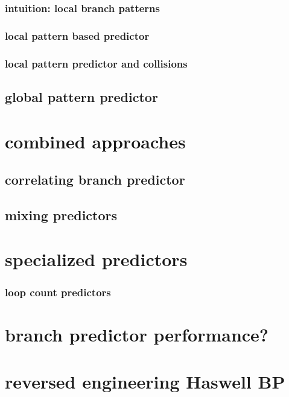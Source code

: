 \subsubsection{intuition: local branch patterns}

\subsubsection{local pattern based predictor}


\subsubsection{local pattern predictor and collisions}


\subsection{global pattern predictor}
 

\section{combined approaches}

\subsection{correlating branch predictor}

\subsection{mixing predictors}


\section{specialized predictors}
\subsubsection{loop count predictors}


\section{branch predictor performance?}


\section{reversed engineering Haswell BP}



